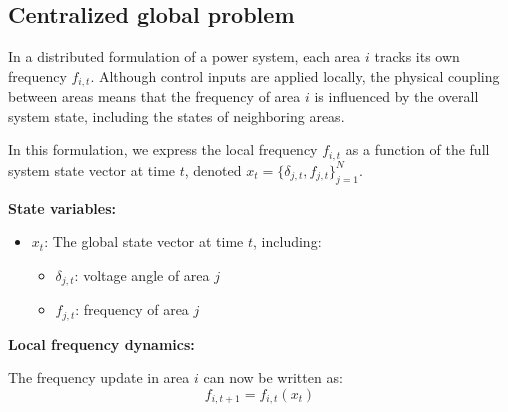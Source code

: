 \documentclass{article}
\begin{document}

\subsection{Centralized global problem}

In a distributed formulation of a power system, each area $i$ tracks its own frequency $f_{i,t}$. Although control inputs are applied locally, the physical coupling between areas means that the frequency of area $i$ is influenced by the overall system state, including the states of neighboring areas.

In this formulation, we express the local frequency $f_{i,t}$ as a function of the full system state vector at time $t$, denoted $x_t = \{ \delta_{j,t}, f_{j,t} \}_{j=1}^{N}$.

\textbf{State variables:}
\begin{itemize}
    \item $x_t$: The global state vector at time $t$, including:
    \begin{itemize}
        \item $\delta_{j,t}$: voltage angle of area $j$
        \item $f_{j,t}$: frequency of area $j$
    \end{itemize}
\end{itemize}

\textbf{Local frequency dynamics:}

The frequency update in area $i$ can now be written as:
\begin{equation}
    f_{i,t+1} = f_{i,t}(x_t)
\end{equation}

\end{document}
